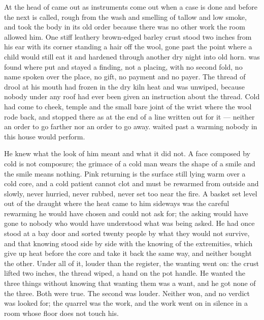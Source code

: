 
At the head of   came out as instruments come out when a case is done and before the next is called, rough from the wash and smelling of tallow and low smoke, and  took the body in its old order because there was no other work the room allowed him. One stiff leathery brown-edged barley crust stood two inches from his ear with its corner standing a hair off the wool, gone past the point where a child would still eat it and hardened through another dry night into old horn.  was found where put and stayed a finding, not a placing, with no second fold, no name spoken over the place, no gift, no payment and no payer. The thread of drool at his mouth had frozen in the dry kiln heat and was unwiped, because nobody under any roof had ever been given an instruction about the thread. Cold had come to cheek, temple and the small bare joint of the wrist where the wool rode back, and stopped there as at the end of a line written out for it --- neither an order to go farther nor an order to go away.  waited past a warming nobody in this house would perform.

He knew what the look of him meant and what it did not. A face composed by cold is not composure; the grimace of a cold man wears the shape of a smile and the smile means nothing. Pink returning is the surface still lying warm over a cold core, and a cold patient cannot clot and must be rewarmed from outside and slowly, never hurried, never rubbed, never set too near the fire. A basket set level out of the draught where the heat came to him sideways was the careful rewarming he would have chosen and could not ask for; the asking would have gone to nobody who would have understood what was being asked. He had once stood at a bay door and sorted twenty people by what they would not survive, and that knowing stood side by side with the knowing of the extremities, which give up heat before the core and take it back the same way, and neither bought the other. Under all of it, louder than the register, the wanting went on: the crust lifted two inches, the thread wiped, a hand on the pot handle. He wanted the three things without knowing that wanting them was a want, and he got none of the three. Both were true. The second was louder. Neither won, and no verdict was looked for; the quarrel was the work, and the work went on in silence in a room whose floor does not touch his.

